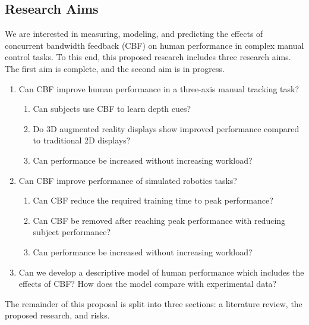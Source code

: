 \documentclass[float=false, crop=false]{standalone}
\begin{document}
\subsection{Research Aims}
We are interested in measuring, modeling, and predicting the effects of concurrent bandwidth feedback (CBF) on human performance in complex manual control tasks.
To this end, this proposed research includes three research aims.
The first aim is complete, and the second aim is in progress.
\begin{enumerate}
\item Can CBF improve human performance in a three-axis manual tracking task?
\begin{enumerate}
\item Can subjects use CBF to learn depth cues?
\item Do 3D augmented reality displays show improved performance compared to traditional 2D displays?
\item Can performance be increased without increasing workload?
\end{enumerate}
\item Can CBF improve performance of simulated robotics tasks?
\begin{enumerate}
\item Can CBF reduce the required training time to peak performance?
\item Can CBF be removed after reaching peak performance with reducing subject performance?
\item Can performance be increased without increasing workload?
\end{enumerate}
\item Can we develop a descriptive model of human performance which includes the effects of CBF? How does the model compare with experimental data?
\end{enumerate}

The remainder of this proposal is split into three sections: a literature review, the proposed research, and risks.
\end{document}
